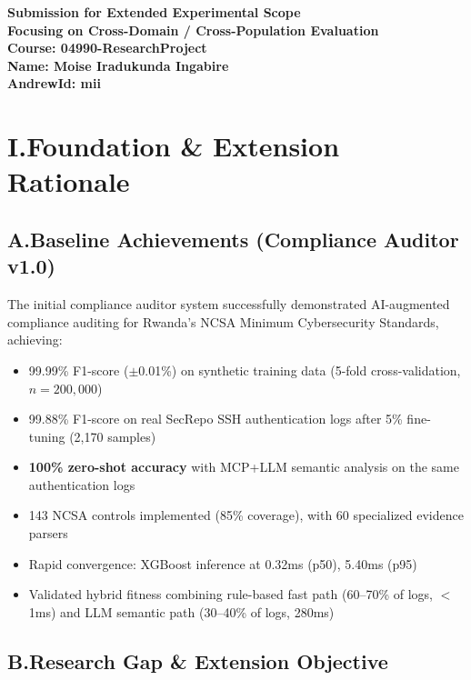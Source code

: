 \documentclass[12pt]{article}
\begin{document}
\begin{center}
\textbf{Submission for Extended Experimental Scope}\\[0.5em]
\textbf{Focusing on Cross-Domain / Cross-Population Evaluation}\\[1em]
\textbf{Course: 04990-ResearchProject}\\
\textbf{Name: Moise Iradukunda Ingabire}\\
\textbf{AndrewId: mii}
\end{center}

\bigskip

\section*{I.\quad Foundation \& Extension Rationale}

\subsection*{A.\quad Baseline Achievements (Compliance Auditor v1.0)}

The initial compliance auditor system successfully demonstrated AI-augmented compliance auditing for Rwanda's NCSA Minimum Cybersecurity Standards, achieving:

\begin{itemize}
    \item 99.99\% F1-score ($\pm$0.01\%) on synthetic training data (5-fold cross-validation, $n=200,000$)
    \item 99.88\% F1-score on real SecRepo SSH authentication logs after 5\% fine-tuning (2,170 samples)
    \item \textbf{100\% zero-shot accuracy} with MCP+LLM semantic analysis on the same authentication logs
    \item 143 NCSA controls implemented (85\% coverage), with 60 specialized evidence parsers
    \item Rapid convergence: XGBoost inference at 0.32ms (p50), 5.40ms (p95)
    \item Validated hybrid fitness combining rule-based fast path (60--70\% of logs, $<$1ms) and LLM semantic path (30--40\% of logs, 280ms)
\end{itemize}

\subsection*{B.\quad Research Gap \& Extension Objective}
\end{document}
